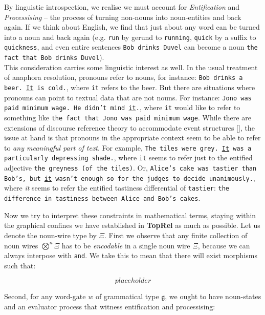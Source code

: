 By linguistic introspection, we realise we must account for \emph{Entification} and \emph{Processising} -- the process of turning non-nouns into noun-entities and back again. If we think about English, we find that just about any word can be turned into a noun and back again (e.g. \texttt{run} by gerund to \texttt{running}, \texttt{quick} by a suffix to \texttt{quickness}, and even entire sentences \texttt{Bob drinks Duvel} can become a noun \texttt{the fact that Bob drinks Duvel}).\\

This consideration carries some linguistic interest as well. In the usual treatment of anaphora resolution, pronouns refer to nouns, for instance: \texttt{Bob drinks a beer. \underline{It} is cold.}, where \texttt{it} refers to the beer. But there are situations where pronouns can point to textual data that are not nouns. For instance: \texttt{Jono was paid minimum wage. He didn't mind \underline{it}.}, where \texttt{it} would like to refer to something like \texttt{the fact that Jono was paid minimum wage}. While there are extensions of discourse reference theory to accommodate event structures [], the issue at hand is that pronouns in the appropriate context seem to be able to refer to \emph{any meaningful part of text}. For example, \texttt{The tiles were grey. \underline{It} was a particularly depressing shade.}, where \texttt{it} seems to refer just to the entified adjective \texttt{the greyness (of the tiles)}. Or, \texttt{Alice's cake was tastier than Bob's, but \underline{it} wasn't enough so for the judges to decide unanimously.}, where \emph{it} seems to refer the entified tastiness differential of \texttt{tastier}: \texttt{the difference in tastiness between Alice and Bob's cakes}.\\

\newthought{}

Now we try to interpret these constraints in mathematical terms, staying within the graphical confines we have established in \textbf{TopRel} as much as possible. Let us denote the noun-wire type by $\Xi$. First we observe that any finite collection of noun wires $\bigotimes^n \Xi$ has to be \emph{encodable} in a single noun wire $\Xi$, because we can always interpose with \texttt{and}. We take this to mean that there will exist morphisms such that:

\[placeholder\]

Second, for any word-gate $w$ of grammatical type $\mathfrak{g}$, we ought to have noun-states and an evaluator process that witness entification and processising:

